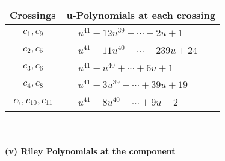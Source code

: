\documentclass[1p]{elsarticle_modified}
\theoremstyle{definition}
\begin{document}
\begin{tabular}{m{50pt}|m{274pt}}
Crossings & \hspace{64pt}u-Polynomials at each crossing \\
\hline $$\begin{aligned}c_{1},c_{9}\end{aligned}$$&$\begin{aligned}
&u^{41}-12 u^{39}+\cdots-2 u+1
\end{aligned}$\\
\hline $$\begin{aligned}c_{2},c_{5}\end{aligned}$$&$\begin{aligned}
&u^{41}-11 u^{40}+\cdots-239 u+24
\end{aligned}$\\
\hline $$\begin{aligned}c_{3},c_{6}\end{aligned}$$&$\begin{aligned}
&u^{41}- u^{40}+\cdots+6 u+1
\end{aligned}$\\
\hline $$\begin{aligned}c_{4},c_{8}\end{aligned}$$&$\begin{aligned}
&u^{41}-3 u^{39}+\cdots+39 u+19
\end{aligned}$\\
\hline $$\begin{aligned}c_{7},c_{10},c_{11}\end{aligned}$$&$\begin{aligned}
&u^{41}-8 u^{40}+\cdots+9 u-2
\end{aligned}$\\
\hline
\end{tabular}\\~\\
\newpage\renewcommand{\arraystretch}{1}
\flushleft \textbf{(v) Riley Polynomials at the component}\newline \\
\end{document}
